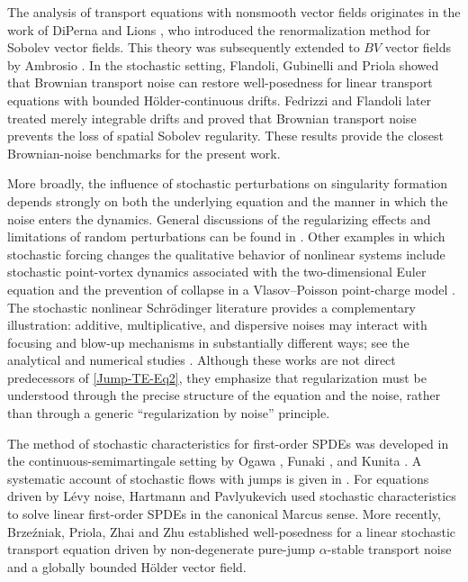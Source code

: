 \documentclass[12pt,oneside, reqno]{amsart}
\numberwithin{equation}{section}
\begin{document}
	The analysis of transport equations with nonsmooth vector fields	originates in the work of DiPerna and Lions	\cite{DiPernaLions1989}, who introduced the renormalization method for	Sobolev vector fields. This theory was subsequently extended to \(BV\)	vector fields by Ambrosio \cite{Ambrosio2004}. In the stochastic	setting, Flandoli, Gubinelli and Priola	\cite{FlandoliGubinelli2010} showed that Brownian transport noise can	restore well-posedness for linear transport equations with bounded	H\"older-continuous drifts. Fedrizzi and Flandoli	\cite{FedrizziFlandoli2013a} later treated merely integrable drifts and	proved that Brownian transport noise prevents the loss of spatial	Sobolev regularity. These results provide the closest Brownian-noise	benchmarks for the present work.
	
	More broadly, the influence of stochastic perturbations on singularity	formation depends strongly on both the underlying equation and the	manner in which the noise enters the dynamics. General discussions of	the regularizing effects and limitations of random perturbations can be	found in \cite{Flandoli2011}. Other examples in which stochastic forcing	changes the qualitative behavior of nonlinear systems include stochastic	point-vortex dynamics associated with the two-dimensional Euler equation	\cite{FlandoliGubinelli2011} and the prevention of collapse in a	Vlasov--Poisson point-charge model \cite{Delarue2014}. The stochastic	nonlinear Schr\"odinger literature provides a complementary illustration:	additive, multiplicative, and dispersive noises may interact with	focusing and blow-up mechanisms in substantially different ways; see	the analytical and numerical studies	\cite{Bouard2002a,Bouard2002b,Bouard2005,Bouard2010,
		Debussche2002a,Debussche2002b,Debussche2011}.	Although these works are not direct predecessors of	\eqref{Jump-TE-Eq2}, they emphasize that regularization must be	understood through the precise structure of the equation and the noise,	rather than through a generic ``regularization by noise'' principle.
	
	The method of stochastic characteristics for first-order SPDEs was	developed in the continuous-semimartingale setting by Ogawa	\cite{Ogawa1973}, Funaki \cite{Funaki1979}, and Kunita	\cite{Kunita1984}. A systematic account of stochastic flows with jumps	is given in \cite{KunitaHiroshi2019}. For equations driven by L\'evy	noise, Hartmann and Pavlyukevich	\cite{HartmannPavlyukevich2023} used stochastic characteristics to solve	linear first-order SPDEs in the canonical Marcus sense. More recently,	Brze\'zniak, Priola, Zhai and Zhu \cite{Brzezniak2025} established	well-posedness for a linear stochastic transport equation driven by	non-degenerate pure-jump \(\alpha\)-stable transport noise and a
	globally bounded H\"older vector field.
	
\end{document}
